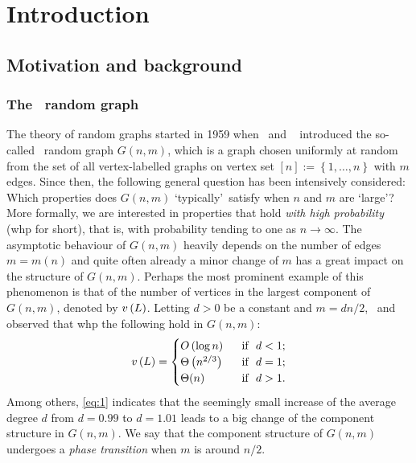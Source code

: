 
\chapter{Introduction}
\section{Motivation and background}

\subsection{The \ER\ random graph}\label{sub:er}
The theory of random graphs started in 1959 when \Erdos\ and \Renyi\ \cite{ErdoesRenyi1959,ErdoesRenyi1960} introduced the so-called \ER\ random graph $G(n,m)$, which is a graph chosen uniformly at random from the set of all vertex-labelled graphs on vertex set $[n]:=\left\{1, \ldots, n\right\}$ with $m$ edges. Since then, the following general question has been intensively considered: Which properties does $G(n,m)$ \lq typically\rq\ satisfy when $n$ and $m$ are \lq large\rq? More formally, we are interested in properties that hold {\em with high probability} (whp for short), that is, with probability tending to one as $n\to \infty$. The asymptotic behaviour of $G(n,m)$ heavily depends on the number of edges $m=m(n)$ and quite often already a minor change of $m$ has a great impact on the structure of $G(n,m)$. Perhaps the most prominent example of this phenomenon is that of the number of vertices in the largest component of $G(n,m)$, denoted by $v\left({L}\right)$. Letting $d>0$ be a constant and $m=dn/2$, \Erdos\ and \Renyi\ \cite{ErdoesRenyi1960} observed that whp the following hold in $G(n,m)$:
\begin{align}\label{eq:1}
v\left({L}\right)=
\begin{cases}
O\left(\log n\right)&\text{~~if~~} d<1;\\
\Theta\left(n^{2/3}\right)&\text{~~if~~} d=1;\\
\Theta(n)&\text{~~if~~} d>1.
\end{cases}
\end{align}
Among others, \eqref{eq:1} indicates that the seemingly small increase of the average degree $d$ from $d=0.99$ to $d=1.01$ leads to a big change of the component structure in $G(n,m)$. We say that the component structure of $G(n,m)$ undergoes a {\em phase transition} when $m$ is around $n/2$.

